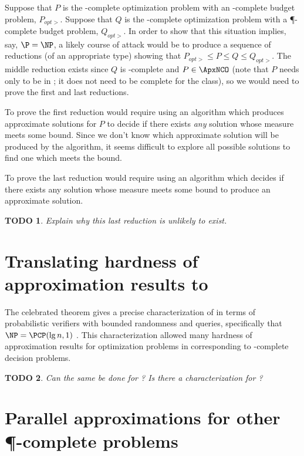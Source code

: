 \documentclass[]{article}
\theoremstyle{plain}
\newtheorem{todo}{TODO}
\theoremstyle{definition}
\begin{document}
Suppose that $P$ is the \ApxNCO-complete optimization problem with an \NP-complete budget problem, $P_{opt>}$.
Suppose that $Q$ is the \ApxNCO-complete optimization problem with a \P-complete budget problem, $Q_{opt>}$.
In order to show that this situation implies, say, $\P=\NP$, a likely course of attack would be to produce a sequence of reductions (of an appropriate type) showing that $P_{opt>} \leq P \leq Q \leq Q_{opt>}$.
The middle reduction exists since $Q$ is \ApxNCO-complete and $P\in\ApxNCO$ (note that $P$ needs only to be in \ApxNCO; it does not need to be complete for the class), so we would need to prove the first and last reductions.

To prove the first reduction would require using an algorithm which produces approximate solutions for $P$ to decide if there exists \emph{any} solution whose measure meets some bound.
Since we don't know which approximate solution will be produced by the algorithm, it seems difficult to explore all possible solutions to find one which meets the bound.

To prove the last reduction would require using an algorithm which decides if there exists any solution whose measure meets some bound to produce an approximate solution.

\begin{todo}
  Explain why this last reduction is unlikely to exist.
\end{todo}

\section{Translating hardness of approximation results to \texorpdfstring{\NC}{NC}}

The celebrated \PCP{} theorem gives a precise characterization of \NP{} in terms of probabilistic verifiers with bounded randomness and queries, specifically that $\NP = \PCP(\lg n, 1)$ \cite{pcp}.
This characterization allowed many hardness of approximation results for optimization problems in \NPO{} corresponding to \NP-complete decision problems.

\begin{todo}
  Can the same be done for \NNC?
  Is there a \PCP{} characterization for \NNC?
\end{todo}

\section{Parallel approximations for other \texorpdfstring{\P}{P}-complete problems}
\end{document}
